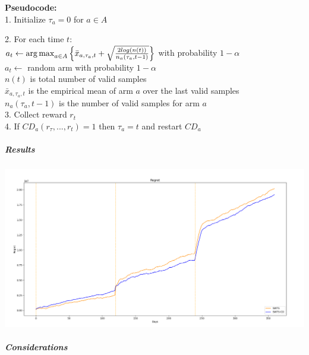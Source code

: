\textbf{Pseudocode:}\\

1. Initialize $\tau_{a} = 0$ for $a\in A$ 

2. For each time $t$:\\

\hspace{0.8cm} $a_{t} \leftarrow \operatorname{arg\,max}_{a \in A}{\left\{\bar{x}_{a,\tau_{a},t} + \sqrt{\frac{2 log(n(t))}{{n_{a}(\tau_{a},t-1)}} }\right\}}$ with probability $1-\alpha$\\

\hspace{0.8cm} $a_{t} \leftarrow$ random arm with probability $1-\alpha$ \\

$n(t)$	is total number of valid samples\\

$\bar{x}_{a,\tau_{a},t}$ is the empirical mean of arm $a$ over the last valid samples\\

$n_{a}(\tau_{a},t-1)$ is the number of valid samples for arm $a$\\

3. Collect reward $r_t$\\

4. If $CD_a (r_{\tau},...,r_t) = 1$ then $\tau_a = t$ and restart $CD_a$

\subparagraph*{Results}
\begin{center}
	\includegraphics[scale=0.35]{Images/n8}
\end{center}
\subparagraph*{Considerations}